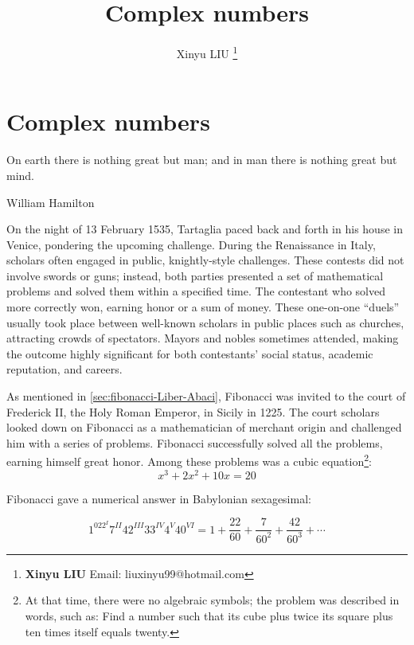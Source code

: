 \documentclass[b5paper]{article}
\begin{document}
\title{Complex numbers}

\author{Xinyu LIU
\thanks{{\bfseries Xinyu LIU} \newline
  Email: liuxinyu99@hotmail.com \newline}
  }

\maketitle
\fi


\ifx\wholebook\relax
\chapter{Complex numbers}
\fi

\epigraph{On earth there is nothing great but man; and in man there is nothing great but mind.}{William Hamilton}

On the night of 13 February 1535, Tartaglia paced back and forth in his house in Venice, pondering the upcoming challenge. During the Renaissance in Italy, scholars often engaged in public, knightly-style challenges. These contests did not involve swords or guns; instead, both parties presented a set of mathematical problems and solved them within a specified time. The contestant who solved more correctly won, earning honor or a sum of money. These one-on-one \enquote{duels} usually took place between well-known scholars in public places such as churches, attracting crowds of spectators. Mayors and nobles sometimes attended, making the outcome highly significant for both contestants' social status, academic reputation, and careers.

As mentioned in \cref{sec:fibonacci-Liber-Abaci}, Fibonacci was invited to the court of Frederick II, the Holy Roman Emperor, in Sicily in 1225. The court scholars looked down on Fibonacci as a mathematician of merchant origin and challenged him with a series of problems. Fibonacci successfully solved all the problems, earning himself great honor. Among these problems was a cubic equation\footnote{At that time, there were no algebraic symbols; the problem was described in words, such as: Find a number such that its cube plus twice its square plus ten times itself equals twenty.}:\[x^3 + 2x^2 + 10x = 20\]

Fibonacci gave a numerical answer in Babylonian sexagesimal:

\[
1^022^{I}7^{II}42^{III}33^{IV}4^{V}40^{VI} = 1 + \frac{22}{60} + \frac{7}{60^2} + \frac{42}{60^3} + \dotsb
\]
\end{document}
